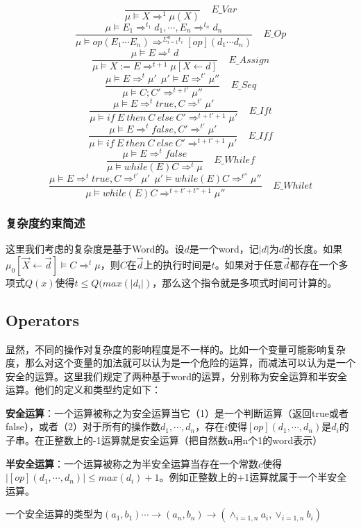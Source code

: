 \documentclass{ctexart}
\begin{document}
\[
\dfrac{}{\mu\models X\Rightarrow^1\mu(X)}~~~~~E\_Var
\]
\[
\dfrac{\mu\models E_1\Rightarrow^{t_1}d_1, \cdots, E_n\Rightarrow^{t_n}d_n}
{\mu\models op(E_1\cdots E_n)\Rightarrow^{\Sigma_{i=1}^n t_i} [op](d_1\cdots d_n)}~~~~~E\_Op
\]
\[
\dfrac{\mu\models E\Rightarrow^t d}{\mu\models X:=E\Rightarrow^{t+1}\mu[X\leftarrow d]}~~~~~E\_Assign
\]
\[
\dfrac{\mu\models E\Rightarrow^t \mu'~~\mu'\models E\Rightarrow^{t'} \mu''}{\mu\models C;C'\Rightarrow^{t+t'} \mu''}~~~~~E\_Seq
\]
\[
\dfrac{\mu\models E\Rightarrow^t true, C\Rightarrow^{t'}\mu'}{\mu\models if~E~then~C~else~C' \Rightarrow^{t+t'+1} \mu'}~~~~~E\_Ift
\]
\[
\dfrac{\mu\models E\Rightarrow^t false, C'\Rightarrow^{t'}\mu'}{\mu\models if~E~then~C~else~C' \Rightarrow^{t+t'+1} \mu'}~~~~~E\_Iff
\]
\[
\dfrac{\mu\models E\Rightarrow^t false}{\mu\models while(E){C}\Rightarrow^t\mu}~~~~~E\_Whilef
\]
\[
\dfrac{\mu\models E\Rightarrow^t true, C\Rightarrow^{t'}\mu'~~\mu'\models while(E){C}\Rightarrow^{t''}\mu''}{\mu\models while(E){C}\Rightarrow^{t+t'+t''+1}\mu''}~~~~~E\_Whilet
\]
\subsubsection{复杂度约束简述}
这里我们考虑的复杂度是基于Word的。设$d$是一个word，记$|d|$为$d$的长度。如果$\mu_0[\overrightarrow{X}\leftarrow \overrightarrow{d}] \models C\Rightarrow^t \mu$，则$C$在$\overrightarrow{d}$上的执行时间是$t$。如果对于任意$\overrightarrow{d}$都存在一个多项式$Q(x)$使得$t\leqslant Q(max(|d_i|)$，那么这个指令就是多项式时间可计算的。
\subsection{Operators}
显然，不同的操作对复杂度的影响程度是不一样的。比如一个变量可能影响复杂度，那么对这个变量的加法就可以认为是一个危险的运算，而减法可以认为是一个安全的运算。这里我们规定了两种基于word的运算，分别称为安全运算和半安全运算。他们的定义和类型约定如下：

\textbf{安全运算}：一个运算被称之为安全运算当它（1）是一个判断运算（返回true或者false），或者（2）对于所有的操作数$d_1,\cdots,d_n$，存在$i$使得$[op](d_1,\cdots,d_n)$是$d_i$的子串。在正整数上的-1运算就是安全运算（把自然数n用n个1的word表示）

\textbf{半安全运算}：一个运算被称之为半安全运算当存在一个常数$c$使得$|[op](d_1,\cdots,d_n)|\leqslant max(d_i)+1$。例如正整数上的+1运算就属于一个半安全运算。

一个安全运算的类型为$(a_1,b_1)\cdots\rightarrow(a_n,b_n)\rightarrow(\wedge_{i=1,n}a_i,\vee_{i=1,n}b_i)$ 
\end{document}
